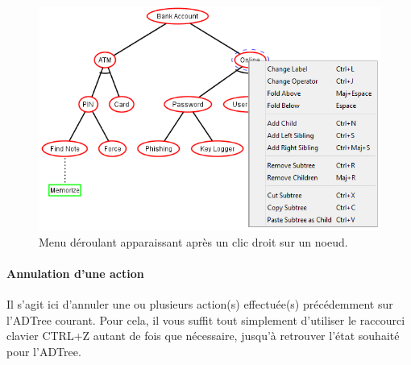     \begin{figure}[!h]
        \centering
        \includegraphics[height=0.7\textwidth]{figure/clicdroit.png}
        \caption{Menu déroulant apparaissant après un clic droit sur un noeud.}
        \label{fig:clicdroit}
    \end{figure}

\paragraph{Annulation d'une action} Il s'agit ici d'annuler une ou plusieurs action(s) effectuée(s) précédemment sur l'ADTree courant. Pour cela, il vous suffit tout simplement d'utiliser le raccourci clavier {\sc CTRL+Z} autant de fois que nécessaire, jusqu'à retrouver l'état souhaité pour l'ADTree.
